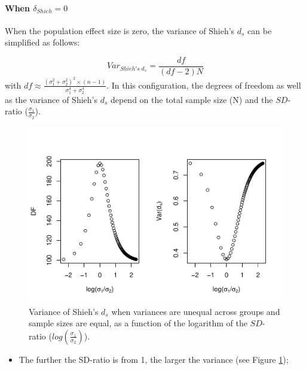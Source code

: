 \documentclass[
  man]{apa6}
\providecommand{\tightlist}{%
  \setlength{\itemsep}{0pt}\setlength{\parskip}{0pt}}
\begin{document}
\hypertarget{when-delta_shieh0-1}{%
\paragraph{\texorpdfstring{When \(\delta_{Shieh}=0\)}{When \textbackslash delta\_\{Shieh\}=0}}\label{when-delta_shieh0-1}}

When the population effect size is zero, the variance of Shieh's \(d_s\) can be simplified as follows:

\[Var_{Shieh's \; d_s} = \frac{df}{(df-2)N}\]
with \(df \approx \frac{(\sigma_1^2+\sigma_2^2)^2 \times (n-1)}{\sigma_1^4+\sigma_2^4}\). In this configuration, the degrees of freedom as well as the variance of Shieh's \(d_s\) depend on the total sample size (N) and the \(SD\)-ratio (\(\frac{\sigma_1}{\sigma_2}\)).

\begin{figure}
\centering
\includegraphics{Theoretical-Variance-of-all-estimators-as-a-function-of-population-parameters_files/figure-latex/varshiehhetbalSDratio2-1.pdf}
\caption{\label{fig:varshiehhetbalSDratio2}Variance of Shieh's \(d_s\) when variances are unequal across groups and sample sizes are equal, as a function of the logarithm of the \(SD\)-ratio (\(log \left( \frac{\sigma_1}{\sigma_2} \right)\)).}
\end{figure}

\begin{itemize}
\tightlist
\item
  The further the SD-ratio is from 1, the larger the variance (see Figure \ref{fig:varshiehhetbalSDratio2});
\end{itemize}
\end{document}
